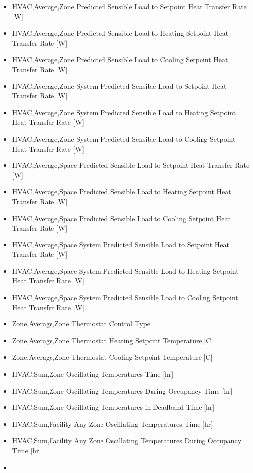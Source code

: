 \begin{itemize}
\item
  HVAC,Average,Zone Predicted Sensible Load to Setpoint Heat Transfer Rate {[}W{]}
\item
  HVAC,Average,Zone Predicted Sensible Load to Heating Setpoint Heat Transfer Rate {[}W{]}
\item
  HVAC,Average,Zone Predicted Sensible Load to Cooling Setpoint Heat Transfer Rate {[}W{]}
\item
  HVAC,Average,Zone System Predicted Sensible Load to Setpoint Heat Transfer Rate {[}W{]}
\item
  HVAC,Average,Zone System Predicted Sensible Load to Heating Setpoint Heat Transfer Rate {[}W{]}
\item
  HVAC,Average,Zone System Predicted Sensible Load to Cooling Setpoint Heat Transfer Rate {[}W{]}
\item
  HVAC,Average,Space Predicted Sensible Load to Setpoint Heat Transfer Rate {[}W{]}
\item
  HVAC,Average,Space Predicted Sensible Load to Heating Setpoint Heat Transfer Rate {[}W{]}
\item
  HVAC,Average,Space Predicted Sensible Load to Cooling Setpoint Heat Transfer Rate {[}W{]}
\item
  HVAC,Average,Space System Predicted Sensible Load to Setpoint Heat Transfer Rate {[}W{]}
\item
  HVAC,Average,Space System Predicted Sensible Load to Heating Setpoint Heat Transfer Rate {[}W{]}
\item
  HVAC,Average,Space System Predicted Sensible Load to Cooling Setpoint Heat Transfer Rate {[}W{]}
\item
  Zone,Average,Zone Thermostat Control Type {[]}
\item
  Zone,Average,Zone Thermostat Heating Setpoint Temperature {[}C{]}
\item
  Zone,Average,Zone Thermostat Cooling Setpoint Temperature {[}C{]}
\item
  HVAC,Sum,Zone Oscillating Temperatures Time [hr]
\item
  HVAC,Sum,Zone Oscillating Temperatures During Occupancy Time [hr]
\item
  HVAC,Sum,Zone Oscillating Temperatures in Deadband Time [hr]
\item
  HVAC,Sum,Facility Any Zone Oscillating Temperatures Time [hr]
\item
  HVAC,Sum,Facility Any Zone Oscillating Temperatures During Occupancy Time [hr]
\item

\end{itemize}
